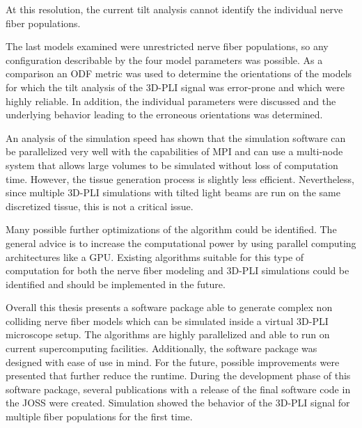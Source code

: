 At this resolution, the current tilt analysis cannot identify the individual nerve fiber populations.
\par
%
The last models examined were unrestricted nerve fiber populations, so any configuration describable by the four model parameters was possible.
As a comparison an \ac{ODF} metric was used to determine the orientations of the models for which the tilt analysis of the \ac{3D-PLI} signal was error-prone and which were highly reliable.
In addition, the individual parameters were discussed and the underlying behavior leading to the erroneous orientations was determined.
\par
%
An analysis of the simulation speed has shown that the simulation software can be parallelized very well with the capabilities of \ac{MPI} and can use a multi-node system that allows large volumes to be simulated without loss of computation time.
However, the tissue generation process is slightly less efficient.
Nevertheless, since multiple \ac{3D-PLI} simulations with tilted light beams are run on the same discretized tissue, this is not a critical issue.
\par
%
Many possible further optimizations of the algorithm could be identified.
The general advice is to increase the computational power by using parallel computing architectures like a \ac{GPU}.
Existing algorithms suitable for this type of computation for both the nerve fiber modeling and \ac{3D-PLI} simulations could be identified and should be implemented in the future.
\par
%
Overall this thesis presents a software package able to generate complex non colliding nerve fiber models which can be simulated inside a virtual \ac{3D-PLI} microscope setup.
%
The algorithms are highly parallelized and able to run on current supercomputing facilities.
Additionally, the software package was designed with ease of use in mind.
%
For the future, possible improvements were presented that further reduce the runtime.
%
During the development phase of this software package, several publications with a release of the final software code in the \ac{JOSS} were created.
%
Simulation showed the behavior of the \ac{3D-PLI} signal for multiple fiber populations for the first time.
